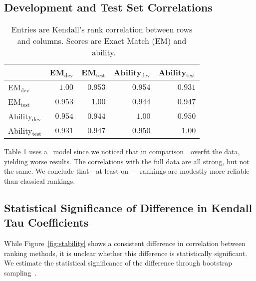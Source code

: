 \subsection{Development and Test Set Correlations}
\begin{table}[t]
  \centering
  \small
      \begin{tabular}{lrrrr}
    \toprule
    {}                      & EM$_{\text{dev}}$ & EM$_{\text{test}}$ & Ability$_{\text{dev}}$ & Ability$_{\text{test}}$ \\
    \midrule
    EM$_{\text{dev}}$       & $1.00$            & $0.953$            & $0.954$                & $0.931$                 \\
    EM$_{\text{test}}$      & $0.953$           & $1.00$             & $0.944$                & $0.947$                 \\
    Ability$_{\text{dev}}$  & $0.954$           & $0.944$            & $1.00$                 & $0.950$                 \\
    Ability$_{\text{test}}$ & $0.931$           & $0.947$            & $0.950$                & $1.00$                  \\
    \bottomrule
  \end{tabular}
  \caption{
    Entries are Kendall's rank correlation between rows and columns.
    Scores are \squad{} Exact Match (EM) and ~ability.
  }
  \label{tab:rank-corr}
\end{table}

Table \ref{tab:rank-corr} uses a ~model since we noticed that in comparison~~overfit the data, yielding worse results.
The correlations with the full data are all strong, but not the same.
We conclude that---at least on \squad{}---\irt{} rankings are modestly more reliable than classical rankings.

\subsection{Statistical Significance of Difference in Kendall Tau Coefficients}
While Figure~\ref{fig:stability} shows a consistent difference in correlation between ranking methods, it is unclear whether this difference is statistically significant.
We estimate the statistical significance of the difference through bootstrap sampling~\citep{efron1994bootstrap}.

